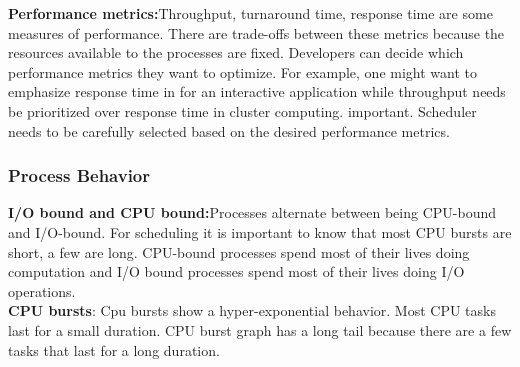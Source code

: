 \documentclass[twoside]{article}
\begin{document}
\textbf{Performance metrics:}Throughput, turnaround time, response time are some measures of performance. There are trade-offs between these metrics because the resources available to the processes are fixed. Developers can decide which performance metrics they want to optimize. For example, one might want to emphasize response time in for an interactive application while throughput needs be prioritized over response time in cluster computing. important. Scheduler needs to be carefully selected based on the desired performance metrics.\\
\subsubsection{Process Behavior}
\textbf{I/O bound and CPU bound:}Processes alternate between being CPU-bound and I/O-bound. For scheduling it is important to know that most CPU bursts are short, a few are long. CPU-bound processes spend most of their lives doing computation and I/O bound processes spend most of their lives doing I/O operations.\\
\textbf{CPU bursts}: Cpu bursts show a hyper-exponential behavior. Most CPU tasks last for a small duration. CPU burst graph has a long tail because there are a few tasks that last for a long duration.\\
\end{document}
